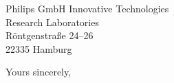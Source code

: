 \documentclass[version=last,
subject=titled,
firsthead=true,
fromalign=center,
fromrule=aftername,
locfield=wide,
firsthead=false,
parskip=half*
]{scrlttr2} %
\begin{document}
\begin{letter}{Philips GmbH Innovative Technologies\\
Research Laboratories\\
R\"ontgenstra\ss e 24--26\\
22335 Hamburg
}
 
 
\closing{Yours sincerely,}
 
\end{letter}
\end{document}
